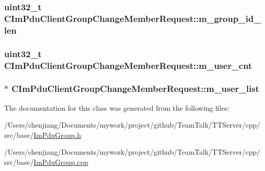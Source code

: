 \subsubsection[{m\+\_\+group\+\_\+id\+\_\+len}]{\setlength{\rightskip}{0pt plus 5cm}uint32\+\_\+t C\+Im\+Pdu\+Client\+Group\+Change\+Member\+Request\+::m\+\_\+group\+\_\+id\+\_\+len\hspace{0.3cm}{\ttfamily [private]}}\label{class_c_im_pdu_client_group_change_member_request_a90423832c1edc34b5f5f1366ad694052}
\hypertarget{class_c_im_pdu_client_group_change_member_request_a2c1f5a8256d1e601ccb8f688f0b46997}{}
\subsubsection[{m\+\_\+user\+\_\+cnt}]{\setlength{\rightskip}{0pt plus 5cm}uint32\+\_\+t C\+Im\+Pdu\+Client\+Group\+Change\+Member\+Request\+::m\+\_\+user\+\_\+cnt\hspace{0.3cm}{\ttfamily [private]}}\label{class_c_im_pdu_client_group_change_member_request_a2c1f5a8256d1e601ccb8f688f0b46997}
\hypertarget{class_c_im_pdu_client_group_change_member_request_a3ab5c3e3ed6c76c17fa4da3fa95cfddf}{}
\subsubsection[{m\+\_\+user\+\_\+list}]{$\ast$ C\+Im\+Pdu\+Client\+Group\+Change\+Member\+Request\+::m\+\_\+user\+\_\+list\hspace{0.3cm}{\ttfamily [private]}}\label{class_c_im_pdu_client_group_change_member_request_a3ab5c3e3ed6c76c17fa4da3fa95cfddf}


The documentation for this class was generated from the following files\+:\begin{DoxyCompactItemize}
\item 
/\+Users/chenjiang/\+Documents/mywork/project/github/\+Team\+Talk/\+T\+T\+Server/cpp/src/base/\hyperlink{_im_pdu_group_8h}{Im\+Pdu\+Group.\+h}\item 
/\+Users/chenjiang/\+Documents/mywork/project/github/\+Team\+Talk/\+T\+T\+Server/cpp/src/base/\hyperlink{_im_pdu_group_8cpp}{Im\+Pdu\+Group.\+cpp}\end{DoxyCompactItemize}
